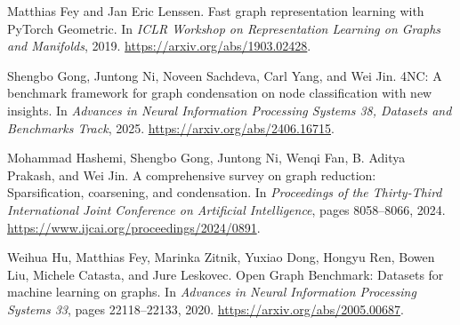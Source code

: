 \documentclass[twoside,11pt]{article}
\begin{document}
\clearpage
\begin{thebibliography}{}

Matthias Fey and Jan Eric Lenssen.
\newblock Fast graph representation learning with PyTorch Geometric.
\newblock In \emph{ICLR Workshop on Representation Learning on Graphs and Manifolds},
2019. \url{https://arxiv.org/abs/1903.02428}.

Shengbo Gong, Juntong Ni, Noveen Sachdeva, Carl Yang, and Wei Jin.
4{NC}: A benchmark framework for graph condensation on node
classification with new insights.
\newblock In \emph{Advances in Neural Information Processing Systems 38,
Datasets and Benchmarks Track}, 2025.
\url{https://arxiv.org/abs/2406.16715}.

Mohammad Hashemi, Shengbo Gong, Juntong Ni, Wenqi Fan, B. Aditya Prakash, and Wei Jin.
\newblock A comprehensive survey on graph reduction: Sparsification, coarsening,
and condensation.
\newblock In \emph{Proceedings of the Thirty-Third International Joint Conference on
Artificial Intelligence}, pages 8058--8066, 2024.
\url{https://www.ijcai.org/proceedings/2024/0891}.

Weihua Hu, Matthias Fey, Marinka Zitnik, Yuxiao Dong, Hongyu Ren, Bowen Liu,
Michele Catasta, and Jure Leskovec.
\newblock Open Graph Benchmark: Datasets for machine learning on graphs.
\newblock In \emph{Advances in Neural Information Processing Systems 33},
pages 22118--22133, 2020. \url{https://arxiv.org/abs/2005.00687}.

\end{thebibliography}
\end{document}
